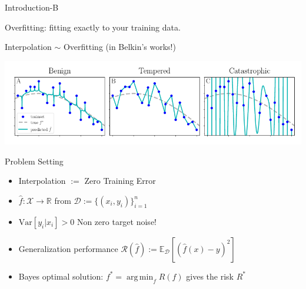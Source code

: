 \documentclass[aspectratio=169]{beamer}
\newcommand{\R}{\mathbb{R}}
\newcommand{\E}{\mathbb{E}}
\newcommand{\D}{\mathcal{D}}
\DeclareMathOperator*{\argmin}{arg\,min}
\begin{document}
\begin{frame}{Introduction-B}
  \begin{minipage}{\textwidth}
    \centering
    \color{Pink} Overfitting: \color{Black} fitting exactly to your training data. 

    \color{Pink} Interpolation $\sim$ Overfitting (in Belkin's works!)\color{Black}
  \end{minipage}
  \begin{minipage}{\textwidth}
    \includegraphics[width=\textwidth]{Figures/overfitting_types}
  \end{minipage}
\end{frame}

\begin{frame}{Problem Setting}
  \begin{minipage}{0.5\textwidth}
    \begin{itemize}
      \item Interpolation $:=$ Zero Training Error
      \item $\hat{f}:\mathcal{X}\to\R$ from $\mathcal{D}:=\{(x_i,y_i)\}_{i=1}^n$
      \item $\text{Var}[y_i|x_i] > 0$  \color{Pink} Non zero target noise! \color{Black}
    \end{itemize}
  \end{minipage}%
  \begin{minipage}{0.5\textwidth}
    \begin{itemize}
      \item Generalization performance $\mathcal{R}(\hat{f}):=\E_\D[(\hat{f}(x)-y)^2]$
      \item Bayes optimal solution: $f^*=\argmin_f R(f)$ gives the risk $R^*$
    \end{itemize}
  \end{minipage}
\end{frame}
\end{document}
